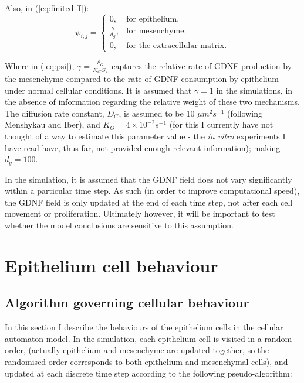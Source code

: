 \documentclass[pdftex,10pt,a4paper]{article}
\begin{document}
Also, in (\ref{eq:finitediff}):
\begin{equation} \label{eq:psi}
\psi_{i,j} =\begin{cases}
0, & \text{for epithelium}.\\
\frac{\gamma}{d_g}, & \text{for mesenchyme}.\\
0, & \text{for the extracellular matrix}.
\end{cases}
\end{equation}

Where in (\ref{eq:psi}), $\gamma = \frac{\rho_G}{K_G G_x}$ captures the relative rate of GDNF production by the mesenchyme compared to the rate of GDNF consumption by epithelium under normal cellular conditions. It is assumed that $\gamma = 1$ in the simulations, in the absence of information regarding the relative weight of these two mechanisms. The diffusion rate constant, $D_G$, is assumed to be 10 $\mu m^2 s^{-1}$ (following Menshykau and Iber), and $K_G = 4 \times 10^{-2} s^{-1}$ (for this I currently have not thought of a way to estimate this parameter value - the \textit{in vitro} experiments I have read have, thus far, not provided enough relevant information); making $d_g = 100$. 

In the simulation, it is assumed that the GDNF field does not vary significantly within a particular time step. As such (in order to improve computational speed), the GDNF field is only updated at the end of each time step, not after each cell movement or proliferation. Ultimately however, it will be important to test whether the model conclusions are sensitive to this assumption.

\section{Epithelium cell behaviour}
\subsection{Algorithm governing cellular behaviour}
In this section I describe the behaviours of the epithelium cells in the cellular automaton model. In the simulation, each epithelium cell is visited in a random order, (actually epithelium and mesenchyme are updated together, so the randomised order corresponds to both epithelium and mesenchymal cells), and updated at each discrete time step according to the following pseudo-algorithm:
\end{document}
